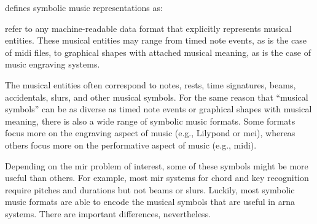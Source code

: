 

\textcite[p.~1]{muller2015music} defines symbolic music
representations as:

\begin{italicquotes}
 refer to any machine-readable
data format that explicitly represents musical entities.
These musical entities may range from timed note events, as
is the case of \gls{midi} ﬁles, to graphical shapes with
attached musical meaning, as is the case of music engraving
systems.
\end{italicquotes}


The musical entities often correspond to notes, rests, time
signatures, beams, accidentals, slurs, and other musical
symbols. For the same reason that ``musical symbols'' can be
as diverse as timed note events or graphical shapes with
musical meaning, there is also a wide range of symbolic
music formats. Some formats focus more on the engraving
aspect of music (e.g., Lilypond or \gls{mei}), whereas
others focus more on the performative aspect of music (e.g.,
\gls{midi}).

Depending on the \gls{mir} problem of interest, some of
these symbols might be more useful than others. For example,
most \gls{mir} systems for chord and key recognition require
pitches and durations but not beams or slurs. Luckily, most
symbolic music formats are able to encode the musical
symbols that are useful in \gls{arna} systems. There are
important differences, nevertheless.
